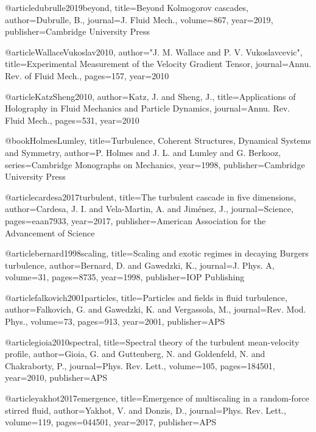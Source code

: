   @article{dubrulle2019beyond,
    title={{Beyond Kolmogorov cascades}},
    author={Dubrulle, B.},
    journal={J. Fluid Mech.},
    volume={867},
    year={2019},
    publisher={Cambridge University Press}
  }

  @article{WallaceVukoslav2010,
    author="J. M. Wallace and P. V. Vukoslavcevic",
    title={{Experimental Measurement of the Velocity Gradient Tensor}},
    journal={Annu. Rev. of Fluid Mech.},
    pages={157},
    year={2010}
  }

  @article{KatzSheng2010,
    author={Katz, J. and Sheng, J.},
    title={{Applications of Holography in Fluid Mechanics and Particle Dynamics}},
    journal={Annu. Rev. Fluid Mech.},
    pages={531},
    year={2010}
  }

  @book{HolmesLumley,
    title={{Turbulence, Coherent Structures, Dynamical Systems and Symmetry}},
    author={P. Holmes and J. L. and Lumley and G. Berkooz},
    series={Cambridge Monographs on Mechanics},
    year={1998},
    publisher={Cambridge University Press}
  }

  @article{cardesa2017turbulent,
    title={{The turbulent cascade in five dimensions}},
    author={Cardesa, J. I. and Vela-Martin, A. and Jim{\'e}nez, J.},
    journal={Science},
    pages={eaan7933},
    year={2017},
    publisher={American Association for the Advancement of Science}
  }

  @article{bernard1998scaling,
    title={{Scaling and exotic regimes in decaying Burgers turbulence}},
    author={Bernard, D. and Gawedzki, K.},
    journal={J. Phys. A},
    volume={31},
    pages={8735},
    year={1998},
    publisher={IOP Publishing}
  }

  @article{falkovich2001particles,
    title={{Particles and fields in fluid turbulence}},
    author={Falkovich, G. and Gawedzki, K. and Vergassola, M.},
    journal={Rev. Mod. Phys.},
    volume={73},
    pages={913},
    year={2001},
    publisher={APS}
  }

  @article{gioia2010spectral,
    title={{Spectral theory of the turbulent mean-velocity profile}},
    author={Gioia, G. and Guttenberg, N. and Goldenfeld, N. and Chakraborty, P.},
    journal={Phys. Rev. Lett.},
    volume={105},
    pages={184501},
    year={2010},
    publisher={APS}
  }

  @article{yakhot2017emergence,
    title={{Emergence of multiscaling in a random-force stirred fluid}},
    author={Yakhot, V. and Donzis, D.},
    journal={Phys. Rev. Lett.},
    volume={119},
    pages={044501},
    year={2017},
    publisher={APS}
  }


